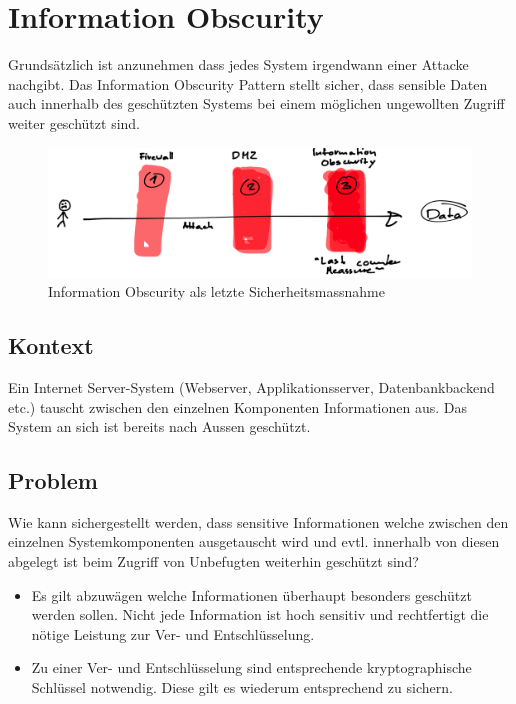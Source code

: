 \section{Information Obscurity}

Grundsätzlich ist anzunehmen dass jedes System irgendwann einer Attacke nachgibt. Das Information Obscurity Pattern stellt sicher, dass sensible Daten auch innerhalb des geschützten Systems bei einem möglichen ungewollten Zugriff weiter geschützt sind.

\begin{figure}[H]
	\centering
	\includegraphics[width=12cm]{content/secure-internet-applications/images/information-obscurity-overview.png}
	\caption{Information Obscurity als letzte Sicherheitsmassnahme}
\end{figure}

\subsection*{Kontext}
Ein Internet Server-System (Webserver, Applikationsserver, Datenbankbackend etc.) tauscht zwischen den einzelnen Komponenten Informationen aus. Das System an sich ist bereits nach Aussen geschützt.

\subsection*{Problem}
Wie kann sichergestellt werden, dass sensitive Informationen welche zwischen den einzelnen Systemkomponenten ausgetauscht wird und evtl. innerhalb von diesen abgelegt ist beim Zugriff von Unbefugten weiterhin geschützt sind?

\begin{itemize}
	\item Es gilt abzuwägen welche Informationen überhaupt besonders geschützt werden sollen. Nicht jede Information ist hoch sensitiv und rechtfertigt die nötige Leistung zur Ver- und Entschlüsselung.
	\item Zu einer Ver- und Entschlüsselung sind entsprechende kryptographische Schlüssel notwendig. Diese gilt es wiederum entsprechend zu sichern.
\end{itemize}

